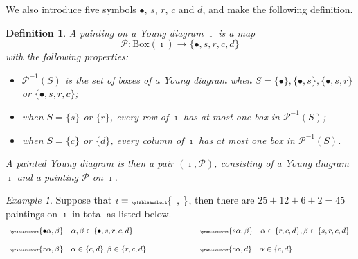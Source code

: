 \documentclass[12pt,a4paper]{amsart}
\newcommand{\CP}{{\mathcal {P}}}
\numberwithin{equation}{section}
\newtheorem{defn}[thm]{Definition}
\theoremstyle{remark}
\newtheorem*{Example}{Example}
\let\ytb=\ytableaushort
\newcommand{\tytb}[1]{{\tiny\ytb{#1}}}
\begin{document}

We also introduce five symbols $\bullet$, $s$, $r$, $c$ and $d$, and make the following definition.
\begin{defn}
A painting on a Young diagram $\imath$ is a map
\[
  \CP: \mathrm{Box}(\imath) \rightarrow \{\bullet, s, r, c, d \}
\]
with the following properties:
\begin{itemize}
\item
 $\CP^{-1}(S)$ is the set of boxes of a Young diagram when $S=\{\bullet\}, \{\bullet, s \}, \{\bullet, s, r\}$ or $\{\bullet, s, r, c \} $;
 \item
 when $S=\{s\}$ or $ \{r\}$, every row of $\imath$ has at most one  box in $\CP^{-1}(S)$;
   \item
 when $S=\{c\}$ or $ \{d \}$, every column of $\imath$ has at most one  box in $\CP^{-1}(S)$.
 \end{itemize}
A painted Young diagram is then a pair $(\imath, \CP)$, consisting of a Young diagram $\imath$ and a painting $\CP$ on $\imath$.

\end{defn}


\begin{Example} Suppose that $\imath=\tytb{\ \ ,\  }$, then there are $25+12+6+2=45$ paintings on $\imath$ in total as listed below.
\begin{equation*}\label{eq:sp-nsp.C}
\begin{array}{ll}
   \tytb{\bullet \alpha ,\beta } \quad \alpha, \beta\in \{\bullet, s,r,c,d\} \qquad \qquad  \qquad  & \tytb{s \alpha ,\beta } \quad \alpha\in \{r,c,d\}, \beta\in \{s,r,c,d\} \medskip \medskip \\
     \tytb{r \alpha ,\beta } \quad \alpha\in \{c,d\}, \beta\in \{r,c,d\} \qquad \qquad  \qquad
   &  \tytb{c \alpha , d } \quad  \alpha\in \{c,d\}
     \end{array}
  \end{equation*}

  \end{Example}
\end{document}
